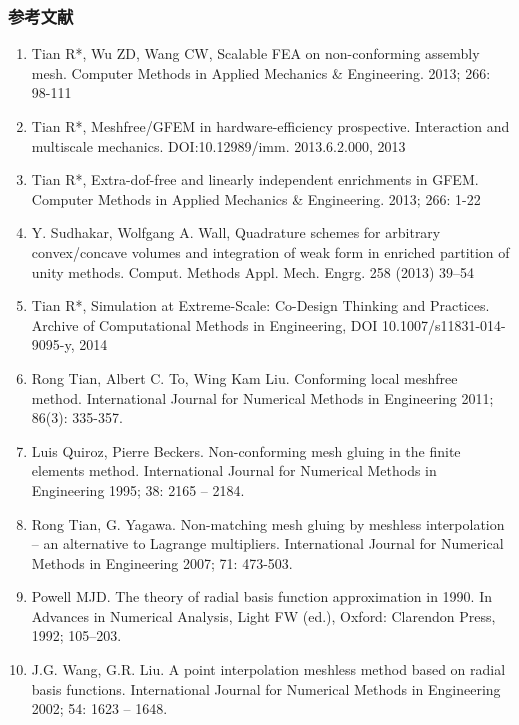 \documentclass[mathserif]{beamer}
\begin{document}
\begin{CJK}{UTF8}{gkai}
\begin{frame}
\frametitle{参考文献}
\begin{enumerate}
	\tiny
	\item Tian R*, Wu ZD, Wang CW, Scalable FEA on non-conforming assembly mesh. Computer Methods in Applied Mechanics \& Engineering. 2013; 266: 98-111
	\item Tian R*, Meshfree/GFEM in hardware-efficiency prospective. Interaction and multiscale mechanics. DOI:10.12989/imm. 2013.6.2.000, 2013 
	\item Tian R*, Extra-dof-free and linearly independent enrichments in GFEM. Computer Methods in Applied Mechanics \& Engineering. 2013; 266: 1-22
	\item Y. Sudhakar, Wolfgang A. Wall, Quadrature schemes for arbitrary convex/concave volumes and integration of weak form in enriched partition of unity methods. Comput. Methods Appl. Mech. Engrg. 258 (2013) 39–54
	\item Tian R*, Simulation at Extreme-Scale: Co-Design Thinking and Practices. Archive of Computational Methods in Engineering, DOI 10.1007/s11831-014-9095-y, 2014
	\item Rong Tian, Albert C. To, Wing Kam Liu. Conforming local meshfree method. International Journal for Numerical Methods in Engineering 2011; 86(3): 335-357.
	\item Luis Quiroz, Pierre Beckers. Non-conforming mesh gluing in the finite elements method. International Journal for Numerical Methods in Engineering 1995; 38: 2165 – 2184.
	\item Rong Tian, G. Yagawa. Non-matching mesh gluing by meshless interpolation – an alternative to Lagrange multipliers. International Journal for Numerical Methods in Engineering 2007; 71: 473-503.
	\item Powell MJD. The theory of radial basis function approximation in 1990. In Advances in Numerical Analysis, Light FW (ed.), Oxford: Clarendon Press, 1992; 105–203.
	\item J.G. Wang, G.R. Liu. A point interpolation meshless method based on radial basis functions. International Journal for Numerical Methods in Engineering 2002; 54: 1623 – 1648.
	

\end{enumerate}
\end{frame}
\end{CJK}
\end{document}
